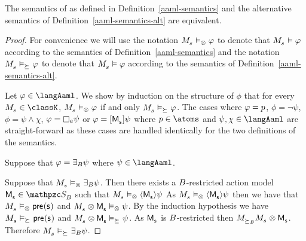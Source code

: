 \begin{corollary}
The semantics of \logicAamlK{} as defined in Definition~\ref{aaml-semantics} and the alternative semantics of Definition~\ref{aaml-semantics-alt} are equivalent.
\end{corollary}

\begin{proof}
For convenience we will use the notation $\kPModel{\kStateS} \entails_\exec \phi$ to denote that $\kPModel{\kStateS} \entails \phi$ according to the semantics of Definition~\ref{aaml-semantics} and the notation $\kPModel{\kStateS} \entails_{\simulates} \phi$ to denote that $\kPModel{\kStateS} \entails \phi$ according to the semantics of Definition~\ref{aaml-semantics-alt}.

Let $\phi \in \langAaml$.
We show by induction on the structure of $\phi$ that for every $\kPModel{\kStateS} \in \classK$, $\kPModel{\kStateS} \entails_\exec \phi$ if and only $\kPModel{\kStateS} \entails_{\simulates} \phi$.
The cases where $\varphi = p$, $\phi = \lnot \psi$,  $\phi = \psi \land \chi$, $\phi = \necessaryA \psi$ or $\phi = \actionA{\aPModel{\aStateS}} \psi$ where $\atomP \in \atoms$ and $\psi, \chi \in \langAaml$ are straight-forward as these cases are handled identically for the two definitions of the semantics.

Suppose that $\varphi = {\exists_{B}} \psi$ where $\psi \in \langAaml$.

Suppose that $\kPModel{\kStateS} \entails_\exec \someactsBs \psi$.
Then there exists a $B$-restricted action model $\aPModel{\aStateS} \in \aSignatureFamily_\agentsB$ such that $\kPModel{\kStateS} \entails_\exec \actionE{\aPModel{\aStateS}} \psi$ 
As $\kPModel{\kStateS} \entails_\exec \actionE{\aPModel{\aStateS}} \psi$ then we have that $\kPModel{\kStateS} \entails_\exec \aPrecondition(\aStateS)$ and 
$\kPModel{\kStateS} \exec \aPModel{\aStateS} \entails_\exec \psi$.
By the induction hypothesis we have $\kPModel{\kStateS} \entails_{\simulates} \aPrecondition(\aStateS)$ and $\kPModel{\kStateS} \exec \aPModel{\aStateS} \entails_{\simulates} \psi$.
As $\aPModel{\aStateS}$ is $B$-restricted then $\kPModel \simulatesBs \kPModel{\kStateS} \exec \aPModel{\aStateS}$.
Therefore $\kPModel{\kStateS} \entails_{\simulates} \someactsBs \psi$.


\end{proof}

